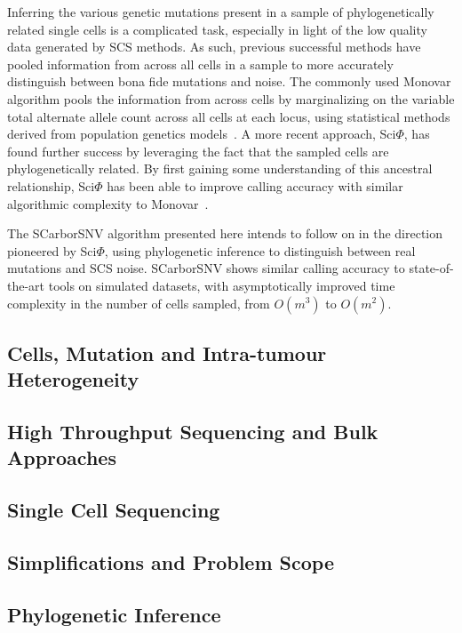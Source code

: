 \documentclass[../main.tex]{subfiles}
\begin{document}
Inferring the various genetic mutations present in a sample of phylogenetically related single cells is a complicated task, especially in light of the low quality data generated by SCS methods.
As such, previous successful methods have pooled information from across all cells in a sample to more accurately distinguish between bona fide mutations and noise.
The commonly used Monovar algorithm pools the information from across cells by marginalizing on the variable total alternate allele count across all cells at each locus, using statistical methods derived from population genetics models~\cite{monovar}.
A more recent approach, Sci$\Phi$, has found further success by leveraging the fact that the sampled cells are phylogenetically related.
By first gaining some understanding of this ancestral relationship, Sci$\Phi$ has been able to improve calling accuracy with similar algorithmic complexity to Monovar~\cite{sciphi}.

The SCarborSNV algorithm presented here intends to follow on in the direction pioneered by Sci$\Phi$, using phylogenetic inference to distinguish between real mutations and SCS noise.
SCarborSNV shows similar calling accuracy to state-of-the-art tools on simulated datasets, with asymptotically improved time complexity in the number of cells sampled, from $O(m^3)$ to $O(m^2)$.

\subsection{Cells, Mutation and Intra-tumour Heterogeneity}


\subsection{High Throughput Sequencing and Bulk Approaches}


\subsection{Single Cell Sequencing}


\subsection{Simplifications and Problem Scope}


\subsection{Phylogenetic Inference}

 
\end{document}

